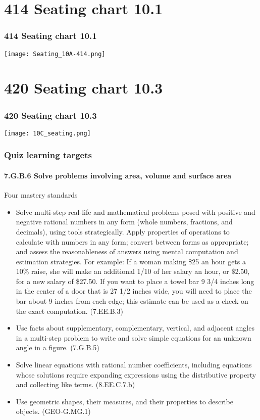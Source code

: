 \documentclass{beamer}
\begin{document}
  \section{414 Seating chart 10.1}
  \frame
  {
    \frametitle{414 Seating chart 10.1}
    \texttt{[image: Seating\_10A-414.png]}
  }

  \section{420 Seating chart 10.3}
  \frame
  {
    \frametitle{420 Seating chart 10.3}
    \begin{center}
      \texttt{[image: 10C\_seating.png]}
    \end{center}
  }

\frame
{
  \frametitle{Quiz learning targets}
  \framesubtitle{7.G.B.6 Solve problems involving area, volume and surface area}

  \begin{block}{Four mastery standards}
    \begin{itemize}
    \item Solve multi-step real-life and mathematical problems posed with positive and negative rational numbers in any form (whole numbers, fractions, and decimals), using tools strategically. Apply properties of operations to calculate with numbers in any form; convert between forms as appropriate; and assess the reasonableness of answers using mental computation and estimation strategies. For example: If a woman making \$25 an hour gets a 10\% raise, she will make an additional 1/10 of her salary an hour, or \$2.50, for a new salary of \$27.50. If you want to place a towel bar 9 3/4 inches long in the center of a door that is 27 1/2 inches wide, you will need to place the bar about 9 inches from each edge; this estimate can be used as a check on the exact computation. (7.EE.B.3)
        
    \item Use facts about supplementary, complementary, vertical, and adjacent angles in a multi-step problem to write and solve simple equations for an unknown angle in a figure. (7.G.B.5)
    
    \item Solve linear equations with rational number coefficients, including equations whose solutions require expanding expressions using the distributive property and collecting like terms. (8.EE.C.7.b)
    
    \item Use geometric shapes, their measures, and their properties to describe objects. (GEO-G.MG.1)
    \end{itemize}
  \end{block}
}
  
\end{document}
